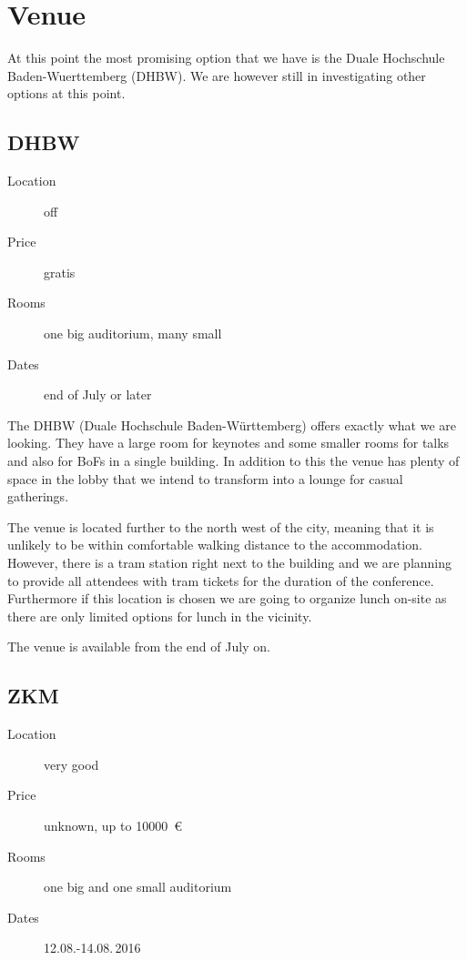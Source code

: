 
\section{Venue}

At this point the most promising option that we have is the Duale Hochschule
Baden-Wuerttemberg (DHBW). We are however still in investigating other options
at this point.

\subsection{DHBW}
\begin{description}
\item[Location] off
\item[Price] gratis
\item[Rooms] one big auditorium, many small
\item[Dates] end of July or later
\end{description}

The DHBW (Duale Hochschule Baden-Württemberg) offers exactly what we are looking.
They have a large room for keynotes and some smaller rooms for talks and
also for BoFs in a single building. In addition to this the venue has
plenty of space in the lobby that we intend to transform into a lounge for
casual gatherings.

The venue is located further to the north west of the city, meaning that it is
unlikely to be within comfortable walking distance to the accommodation. However,
there is a tram station right next to the building and we are planning
to provide all attendees with tram tickets for the duration of the
conference. Furthermore if this location is chosen we are going to organize
lunch on-site as there are only limited options for lunch in the vicinity.

The venue is available from the end of July on.


\subsection{ZKM}
\begin{description}
\item[Location] very good
\item[Price] unknown, up to \SI{10000}{\euro}
\item[Rooms] one big and one small auditorium
\item[Dates] 12.08.-14.08.\,2016
\end{description}

